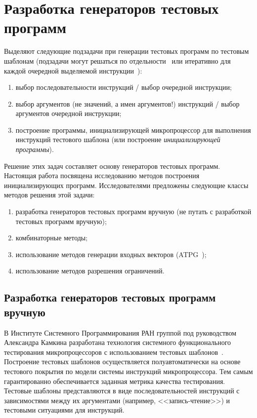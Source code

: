 \section{Разработка генераторов тестовых программ}

Выделяют следующие подзадачи при генерации тестовых программ по
тестовым шаблонам (подзадачи могут решаться по
отдельности~\cite{kamkin} или итеративно для каждой очередной
выделяемой инструкции~\cite{GenesysPro}):
\begin{enumerate}
  \item выбор последовательности инструкций / выбор очередной
  инструкции;
  \item выбор аргументов (не значений, а имен аргументов!) инструкций /
  выбор аргументов очередной инструкции;
  \item построение программы, инициализирующей микропроцессор для выполнения
  инструкций тестового шаблона (или построение \emph{инициализирующей программы}).
\end{enumerate}

Решение этих задач составляет основу генераторов тестовых программ.
Настоящая работа посвящена исследованию методов построения
инициализирующих программ. Исследователями предложены следующие
классы методов решения этой задачи:
\begin{enumerate}
\item разработка генераторов тестовых программ вручную (не путать с
разработкой тестовых программ вручную);
\item комбинаторные методы;
\item использование методов генерации входных векторов (ATPG~\cite{ATPGbook});
\item использование методов разрешения ограничений.
\end{enumerate}

\subsection{Разработка генераторов тестовых программ вручную}

В Институте Системного Программирования РАН группой под руководством
Александра Камкина разработана технология системного функционального
тестирования микропроцессоров с использованием тестовых
шаблонов~\cite{kamkin, vorobyev}. Построение тестовых шаблонов
осуществляется полуавтоматически на основе тестового покрытия по
модели системы инструкций микропроцессора. Тем самым гарантированно
обеспечивается заданная метрика качества тестирования. Тестовые
шаблоны представляются в виде последовательностей инструкций с
зависимостями между их аргументами (например, <<запись-чтение>>) и
тестовыми ситуациями для инструкций.

